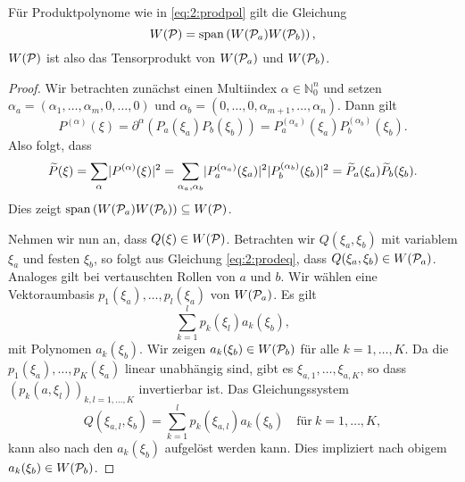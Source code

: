 \begin{thm}
Für Produktpolynome wie in \eqref{eq:2:prodpol}
gilt die Gleichung
\begin{equation}
W(\mathcal P)=\operatorname{span}\left(W(\mathcal P_a) W(\mathcal P_b)\right),
\end{equation}
$W(\mathcal P)$ ist also das Tensorprodukt von $W(\mathcal P_a)$ und $W(\mathcal P_b)$.
\end{thm}
\begin{proof}
Wir betrachten zunächst einen Multiindex $\alpha\in\mathbb N_0^n$ und setzen $\alpha_a=(\alpha_1,\dots,\alpha_m,0,\dots,0)$
und $\alpha_b=(0,\dots,0,\alpha_{m+1},\dots,\alpha_n)$. Dann gilt
\begin{equation}
P^{(\alpha)}(\xi)
=\partial^\alpha\left(P_a(\xi_a)P_b(\xi_b)\right)
=P^{(\alpha_a)}_a(\xi_a)P^{(\alpha_b)}_b(\xi_b).
\end{equation} 
Also folgt, dass
\begin{equation}\label{eq:2:prodeq}
\widetilde{P}(\xi)=\sum_\alpha\lvert P^{(\alpha)}(\xi)\rvert^2
=\sum_{\alpha_a,\alpha_b}\lvert P^{(\alpha_a)}_a(\xi_a)\rvert^2\lvert P^{(\alpha_b)}_b(\xi_b)\rvert^2
=\widetilde{P}_a(\xi_a)\widetilde{P}_b(\xi_b).
\end{equation}
Dies zeigt $\operatorname{span}\left(W(\mathcal P_a) W(\mathcal P_b)\right)\subseteq W(\mathcal P)$. 

Nehmen wir nun an, dass $Q(\xi)\in W(\mathcal P)$.
Betrachten wir $Q(\xi_a,\xi_{b})$ mit variablem $\xi_a$ und festen $\xi_{b}$,
so folgt aus Gleichung \eqref{eq:2:prodeq},
dass $Q(\xi_a,\xi_{b})\in W(\mathcal P_a)$.
Analoges gilt bei vertauschten Rollen von $a$ und $b$.
Wir wählen eine Vektoraumbasis $p_1(\xi_a),\dots,p_l(\xi_a)$ von $W(\mathcal P_a)$.
Es gilt
\begin{equation}
\sum_{k=1}^lp_k(\xi_l)a_k(\xi_b),
\end{equation}
mit Polynomen $a_k(\xi_b)$.
Wir zeigen $a_k(\xi_b)\in W(\mathcal P_b)$ für alle $k=1,\dots,K$.
Da die $p_1(\xi_a),\dots,p_K(\xi_a)$ linear unabhängig sind,
gibt es $\xi_{a,1},\dots,\xi_{a,K}$,
so dass $\left(p_k(a,\xi_l)\right)_{k,l=1,\dots,K}$ invertierbar ist.
Das Gleichungssystem
\begin{equation}
Q(\xi_{a,l},\xi_b)=\sum_{k=1}^lp_k(\xi_{a,l})a_k(\xi_b)\quad\text{für}~k=1,\dots,K,
\end{equation}
kann also nach den $a_k(\xi_b)$ aufgelöst werden kann.
Dies impliziert nach obigem $a_k(\xi_b)\in W(\mathcal P_b)$.

\end{proof}

